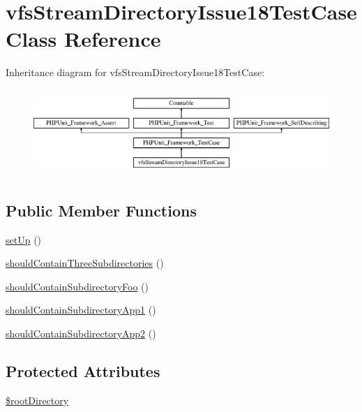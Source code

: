 \hypertarget{classorg_1_1bovigo_1_1vfs_1_1vfs_stream_directory_issue18_test_case}{}\section{vfs\+Stream\+Directory\+Issue18\+Test\+Case Class Reference}
\label{classorg_1_1bovigo_1_1vfs_1_1vfs_stream_directory_issue18_test_case}
Inheritance diagram for vfs\+Stream\+Directory\+Issue18\+Test\+Case\+:\begin{figure}[H]
\begin{center}
\leavevmode
\includegraphics[height=3.303835cm]{classorg_1_1bovigo_1_1vfs_1_1vfs_stream_directory_issue18_test_case}
\end{center}
\end{figure}
\subsection*{Public Member Functions}
\begin{DoxyCompactItemize}
\item 
\mbox{\hyperlink{classorg_1_1bovigo_1_1vfs_1_1vfs_stream_directory_issue18_test_case_a0bc688732d2b3b162ffebaf7812e78da}{set\+Up}} ()
\item 
\mbox{\hyperlink{classorg_1_1bovigo_1_1vfs_1_1vfs_stream_directory_issue18_test_case_a3974bf8e04dfbcb8d7007f1130a2e5c6}{should\+Contain\+Three\+Subdirectories}} ()
\item 
\mbox{\hyperlink{classorg_1_1bovigo_1_1vfs_1_1vfs_stream_directory_issue18_test_case_ac0c48de3c4f1328f8f652a8f9d7d5ff4}{should\+Contain\+Subdirectory\+Foo}} ()
\item 
\mbox{\hyperlink{classorg_1_1bovigo_1_1vfs_1_1vfs_stream_directory_issue18_test_case_ab4391642ddf0a94ec6403edaff81bb9b}{should\+Contain\+Subdirectory\+App1}} ()
\item 
\mbox{\hyperlink{classorg_1_1bovigo_1_1vfs_1_1vfs_stream_directory_issue18_test_case_a888b23a824e2fa024b24f69e5163b8f3}{should\+Contain\+Subdirectory\+App2}} ()
\end{DoxyCompactItemize}
\subsection*{Protected Attributes}
\begin{DoxyCompactItemize}
\item 
\mbox{\hyperlink{classorg_1_1bovigo_1_1vfs_1_1vfs_stream_directory_issue18_test_case_aa702089306c5d5468dd8af979199e1ac}{\$root\+Directory}}
\end{DoxyCompactItemize}
